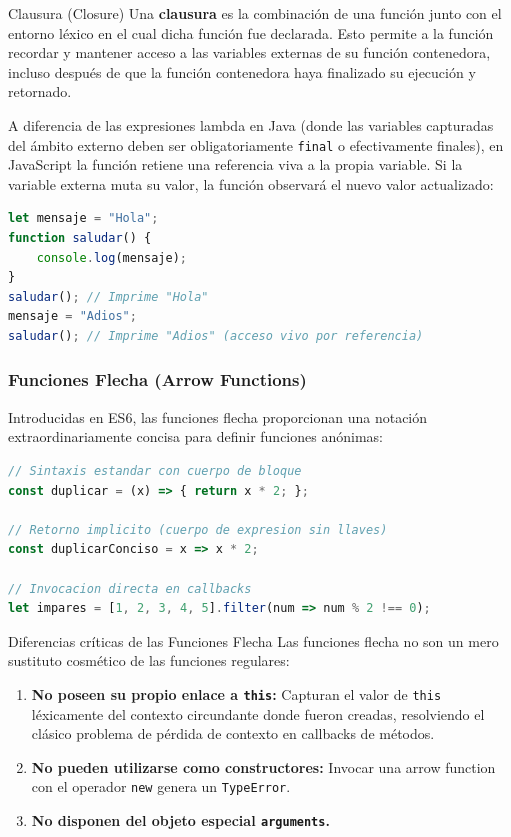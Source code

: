 \begin{definicion}{Clausura (Closure)}
Una \textbf{clausura} es la combinación de una función junto con el entorno léxico en el cual dicha función fue declarada. Esto permite a la función recordar y mantener acceso a las variables externas de su función contenedora, incluso después de que la función contenedora haya finalizado su ejecución y retornado.
\end{definicion}

A diferencia de las expresiones lambda en Java (donde las variables capturadas del ámbito externo deben ser obligatoriamente \texttt{final} o efectivamente finales), en JavaScript la función retiene una referencia viva a la propia variable. Si la variable externa muta su valor, la función observará el nuevo valor actualizado:
\begin{lstlisting}[language=javascript]
let mensaje = "Hola";
function saludar() {
    console.log(mensaje);
}
saludar(); // Imprime "Hola"
mensaje = "Adios";
saludar(); // Imprime "Adios" (acceso vivo por referencia)
\end{lstlisting}

\subsubsection{Funciones Flecha (Arrow Functions)}
Introducidas en ES6, las funciones flecha proporcionan una notación extraordinariamente concisa para definir funciones anónimas:
\begin{lstlisting}[language=javascript]
// Sintaxis estandar con cuerpo de bloque
const duplicar = (x) => { return x * 2; };

// Retorno implicito (cuerpo de expresion sin llaves)
const duplicarConciso = x => x * 2;

// Invocacion directa en callbacks
let impares = [1, 2, 3, 4, 5].filter(num => num % 2 !== 0);
\end{lstlisting}

\begin{importante}{Diferencias críticas de las Funciones Flecha}
Las funciones flecha no son un mero sustituto cosmético de las funciones regulares:
\begin{enumerate}
    \item \textbf{No poseen su propio enlace a \texttt{this}:} Capturan el valor de \texttt{this} léxicamente del contexto circundante donde fueron creadas, resolviendo el clásico problema de pérdida de contexto en callbacks de métodos.
    \item \textbf{No pueden utilizarse como constructores:} Invocar una arrow function con el operador \texttt{new} genera un \texttt{TypeError}.
    \item \textbf{No disponen del objeto especial \texttt{arguments}.}
\end{enumerate}
\end{importante}

